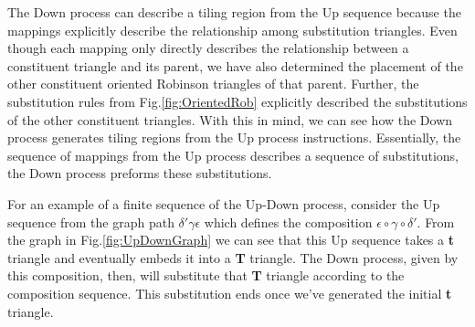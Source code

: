 \documentclass[
  oneside,
  11pt, a4paper,
  footinclude=true,
  headinclude=true,
  cleardoublepage=empty
]{scrbook}
\begin{document}
The Down process can describe a tiling region from the Up sequence because the mappings explicitly describe the relationship among substitution triangles. Even though each mapping only directly describes the relationship between a constituent triangle and its parent, we have also determined the placement of the other constituent oriented Robinson triangles of that parent. Further, the substitution rules from Fig.\ref{fig:OrientedRob} explicitly described the substitutions of the other constituent triangles. With this in mind, we can see how the Down process generates tiling regions from the Up process instructions. Essentially, the sequence of mappings from the Up process describes a sequence of substitutions, the Down process preforms these substitutions.

For an example of a finite sequence of the Up-Down process, consider the Up sequence from the graph path $\delta'\gamma\epsilon$ which defines the composition $\epsilon \circ \gamma \circ \delta'$. From the graph in Fig.\ref{fig:UpDownGraph} we can see that this Up sequence takes a \textbf{t} triangle and eventually embeds it into a \textbf{T} triangle. The Down process, given by this composition, then, will substitute that \textbf{T} triangle according to the composition sequence. This substitution ends once we've generated the initial \textbf{t} triangle. 
\end{document}
